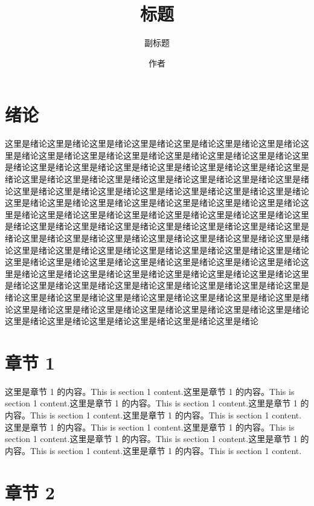 \documentclass[UTF8]{article}
\title{标题}
\subtitle{副标题}
\author{作者}
\date{}
\begin{document}
	
	\setcounter{page}{1}
	\tableofcontents


	\newpage
	\setcounter{page}{1}

	\section{绪论}

	这里是绪论这里是绪论这里是绪论这里是绪论这里是绪论这里是绪论这里是绪论这里是绪论这里是绪论这里是绪论这里是绪论这里是绪论这里是绪论这里是绪论这里是绪论这里是绪论这里是绪论这里是绪论这里是绪论这里是绪论这里是绪论这里是绪论这里是绪论这里是绪论这里是绪论这里是绪论这里是绪论这里是绪论这里是绪论这里是绪论这里是绪论这里是绪论这里是绪论这里是绪论这里是绪论这里是绪论这里是绪论这里是绪论这里是绪论这里是绪论这里是绪论这里是绪论这里是绪论这里是绪论这里是绪论这里是绪论这里是绪论这里是绪论这里是绪论这里是绪论这里是绪论这里是绪论这里是绪论这里是绪论这里是绪论这里是绪论这里是绪论这里是绪论这里是绪论这里是绪论这里是绪论这里是绪论这里是绪论这里是绪论这里是绪论这里是绪论这里是绪论这里是绪论这里是绪论这里是绪论这里是绪论这里是绪论这里是绪论这里是绪论这里是绪论这里是绪论这里是绪论这里是绪论这里是绪论这里是绪论这里是绪论这里是绪论这里是绪论这里是绪论这里是绪论这里是绪论这里是绪论这里是绪论这里是绪论这里是绪论这里是绪论这里是绪论这里是绪论这里是绪论这里是绪论这里是绪论这里是绪论这里是绪论这里是绪论这里是绪论这里是绪论这里是绪论这里是绪论这里是绪论这里是绪论这里是绪论这里是绪论这里是绪论这里是绪论这里是绪论这里是绪论这里是绪论这里是绪论这里是绪论

	\section{章节 1}

	这里是章节 1 的内容。This is section 1 content.这里是章节 1 的内容。This is section 1 content.这里是章节 1 的内容。This is section 1 content.这里是章节 1 的内容。This is section 1 content.这里是章节 1 的内容。This is section 1 content.这里是章节 1 的内容。This is section 1 content.这里是章节 1 的内容。This is section 1 content.这里是章节 1 的内容。This is section 1 content.这里是章节 1 的内容。This is section 1 content.这里是章节 1 的内容。This is section 1 content.\cite{test1}

	\section{章节 2}
\end{document}
